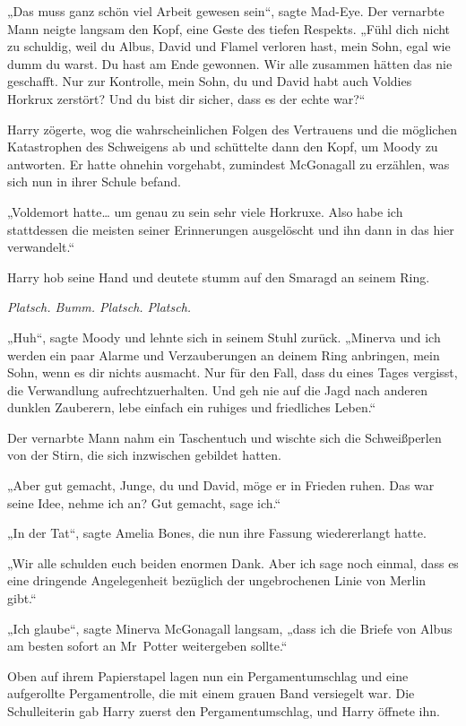 {„Das muss ganz schön viel Arbeit gewesen sein“, sagte Mad-Eye. Der vernarbte Mann neigte langsam den Kopf, eine Geste des tiefen Respekts. „Fühl dich nicht zu schuldig, weil du Albus, David und Flamel verloren hast, mein Sohn, egal wie dumm du warst. Du hast am Ende gewonnen. Wir alle zusammen hätten das nie geschafft. Nur zur Kontrolle, mein Sohn, du und David habt auch Voldies Horkrux zerstört? Und du bist dir sicher, dass es der echte war?“

Harry zögerte, wog die wahrscheinlichen Folgen des Vertrauens und die möglichen Katastrophen des Schweigens ab und schüttelte dann den Kopf, um Moody zu antworten. Er hatte ohnehin vorgehabt, zumindest McGonagall zu erzählen, was sich nun in ihrer Schule befand.

„Voldemort hatte… um genau zu sein sehr viele Horkruxe. Also habe ich stattdessen die meisten seiner Erinnerungen ausgelöscht und ihn dann in das hier verwandelt.“

Harry hob seine Hand und deutete stumm auf den Smaragd an seinem Ring.

\emph{Platsch. Bumm. Platsch. Platsch.}

„Huh“, sagte Moody und lehnte sich in seinem Stuhl zurück. „Minerva und ich werden ein paar Alarme und Verzauberungen an deinem Ring anbringen, mein Sohn, wenn es dir nichts ausmacht. Nur für den Fall, dass du eines Tages vergisst, die Verwandlung aufrechtzuerhalten. Und geh nie auf die Jagd nach anderen dunklen Zauberern, lebe einfach ein ruhiges und friedliches Leben.“

Der vernarbte Mann nahm ein Taschentuch und wischte sich die Schweißperlen von der Stirn, die sich inzwischen gebildet hatten.

„Aber gut gemacht, Junge, du und David, möge er in Frieden ruhen. Das war seine Idee, nehme ich an? Gut gemacht, sage ich.“

„In der Tat“, sagte Amelia Bones, die nun ihre Fassung wiedererlangt hatte.

„Wir alle schulden euch beiden enormen Dank. Aber ich sage noch einmal, dass es eine dringende Angelegenheit bezüglich der ungebrochenen Linie von Merlin gibt.“

„Ich glaube“, sagte Minerva McGonagall langsam, „dass ich die Briefe von Albus am besten sofort an Mr~Potter weitergeben sollte.“

Oben auf ihrem Papierstapel lagen nun ein Pergamentumschlag und eine aufgerollte Pergamentrolle, die mit einem grauen Band versiegelt war. Die Schulleiterin gab Harry zuerst den Pergamentumschlag, und Harry öffnete ihn.

}
